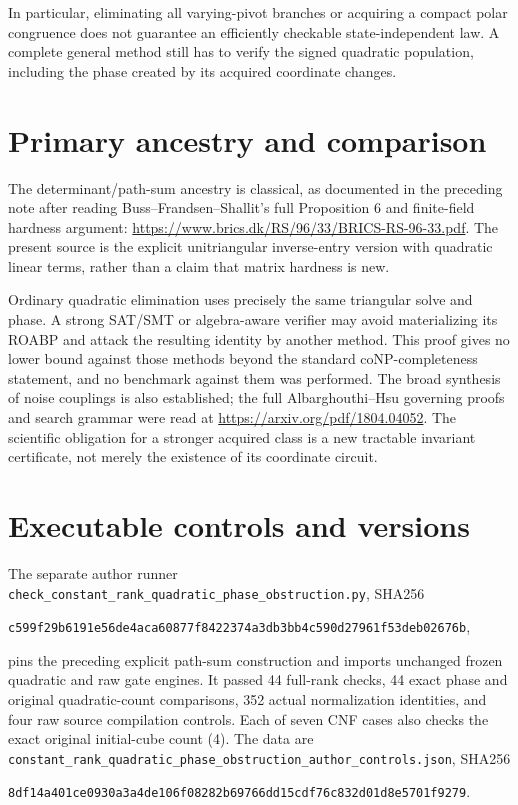 \documentclass[11pt]{article}
\begin{document}
In particular, eliminating all varying-pivot branches or acquiring a compact
polar congruence does not guarantee an efficiently checkable state-independent
law.  A complete general method still has to verify the signed quadratic
population, including the phase created by its acquired coordinate changes.

\section{Primary ancestry and comparison}

The determinant/path-sum ancestry is classical, as documented in the preceding
note after reading Buss--Frandsen--Shallit's full Proposition 6 and finite-field
hardness argument:
\url{https://www.brics.dk/RS/96/33/BRICS-RS-96-33.pdf}.
The present source is the explicit unitriangular inverse-entry version with
quadratic linear terms, rather than a claim that matrix hardness is new.

Ordinary quadratic elimination uses precisely the same triangular solve and
phase.  A strong SAT/SMT or algebra-aware verifier may avoid materializing its
ROABP and attack the resulting identity by another method.  This proof gives
no lower bound against those methods beyond the standard coNP-completeness
statement, and no benchmark against them was performed.  The broad synthesis
of noise couplings is also established; the full Albarghouthi--Hsu governing
proofs and search grammar were read at
\url{https://arxiv.org/pdf/1804.04052}.
The scientific obligation for a stronger acquired class is a new tractable
invariant certificate, not merely the existence of its coordinate circuit.

\section{Executable controls and versions}

The separate author runner
\texttt{check\_constant\_rank\_quadratic\_phase\_obstruction.py}, SHA256
\begin{center}\scriptsize\texttt{c599f29b6191e56de4aca60877f8422374a3db3bb4c590d27961f53deb02676b},\end{center}
pins the preceding explicit path-sum construction and imports unchanged frozen
quadratic and raw gate engines.  It passed 44 full-rank checks, 44 exact phase
and original quadratic-count comparisons, 352 actual normalization identities,
and four raw source compilation controls.  Each of seven CNF cases also checks
the exact original initial-cube count (4).  The data are
\texttt{constant\_rank\_quadratic\_phase\_obstruction\_author\_controls.json}, SHA256
\begin{center}\scriptsize\texttt{8df14a401ce0930a3a4de106f08282b69766dd15cdf76c832d01d8e5701f9279}.\end{center}
\end{document}
